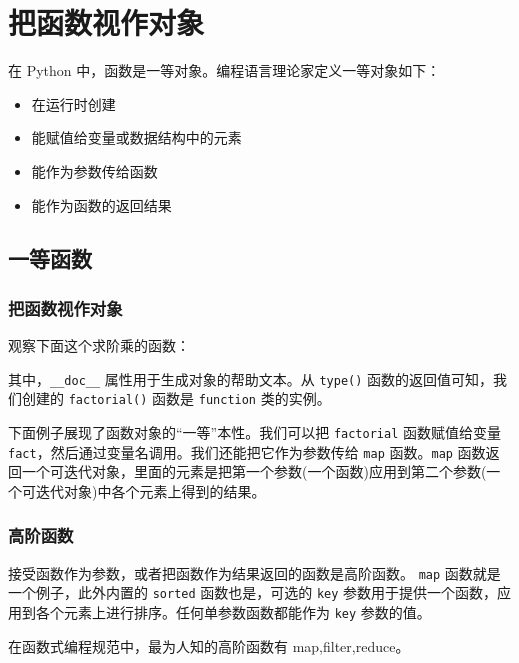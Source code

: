 \chapter{把函数视作对象}

在 Python 中，函数是一等对象。编程语言理论家定义一等对象如下：
\begin{itemize}
    \item 在运行时创建
    \item 能赋值给变量或数据结构中的元素
    \item 能作为参数传给函数
    \item 能作为函数的返回结果
\end{itemize}

\section{一等函数}
\subsection{把函数视作对象}

观察下面这个求阶乘的函数：



其中，\texttt{\_\_doc\_\_} 属性用于生成对象的帮助文本。从 \texttt{type()} 函数的返回值可知，我们创建的 \texttt{factorial()} 函数是 \texttt{function} 类的实例。

下面例子展现了函数对象的``一等''本性。我们可以把 \texttt{factorial} 函数赋值给变量 \texttt{fact}，然后通过变量名调用。我们还能把它作为参数传给 \texttt{map} 函数。\texttt{map} 函数返回一个可迭代对象，里面的元素是把第一个参数(一个函数)应用到第二个参数(一个可迭代对象)中各个元素上得到的结果。



\subsection{高阶函数}

接受函数作为参数，或者把函数作为结果返回的函数是高阶函数。 \texttt{map} 函数就是一个例子，此外内置的 \texttt{sorted} 函数也是，可选的 \texttt{key} 参数用于提供一个函数，应用到各个元素上进行排序。任何单参数函数都能作为 \texttt{key} 参数的值。



在函数式编程规范中，最为人知的高阶函数有 map,filter,reduce。

